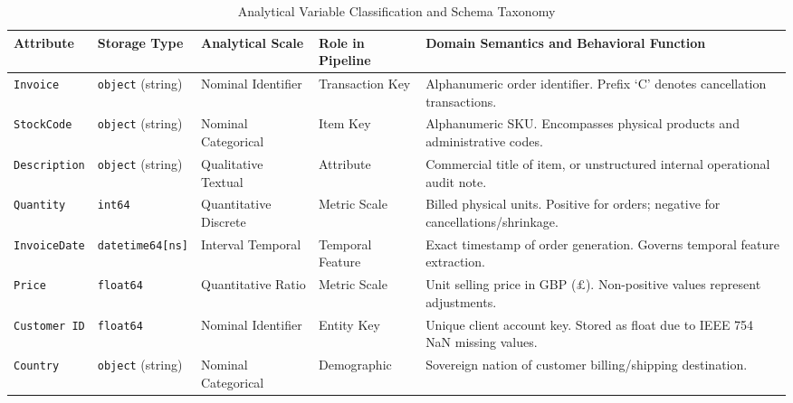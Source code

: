 \documentclass[journal,10pt,twocolumn]{IEEEtran}
\begin{document}
\begin{table}[htbp]
\caption{Analytical Variable Classification and Schema Taxonomy}
\label{tab:variable_taxonomy}
\centering
\begin{tabularx}{\textwidth}{llllX}
\toprule
\textbf{Attribute} & \textbf{Storage Type} & \textbf{Analytical Scale} & \textbf{Role in Pipeline} & \textbf{Domain Semantics and Behavioral Function} \\
\midrule
\texttt{Invoice} & \texttt{object} (string) & Nominal Identifier & Transaction Key & Alphanumeric order identifier. Prefix `C' denotes cancellation transactions. \\
\texttt{StockCode} & \texttt{object} (string) & Nominal Categorical & Item Key & Alphanumeric SKU. Encompasses physical products and administrative codes. \\
\texttt{Description} & \texttt{object} (string) & Qualitative Textual & Attribute & Commercial title of item, or unstructured internal operational audit note. \\
\texttt{Quantity} & \texttt{int64} & Quantitative Discrete & Metric Scale & Billed physical units. Positive for orders; negative for cancellations/shrinkage. \\
\texttt{InvoiceDate} & \texttt{datetime64[ns]} & Interval Temporal & Temporal Feature & Exact timestamp of order generation. Governs temporal feature extraction. \\
\texttt{Price} & \texttt{float64} & Quantitative Ratio & Metric Scale & Unit selling price in GBP ($\pounds$). Non-positive values represent adjustments. \\
\texttt{Customer ID} & \texttt{float64} & Nominal Identifier & Entity Key & Unique client account key. Stored as float due to IEEE 754 NaN missing values. \\
\texttt{Country} & \texttt{object} (string) & Nominal Categorical & Demographic & Sovereign nation of customer billing/shipping destination. \\
\bottomrule
\end{tabularx}
\end{table}
\end{document}
